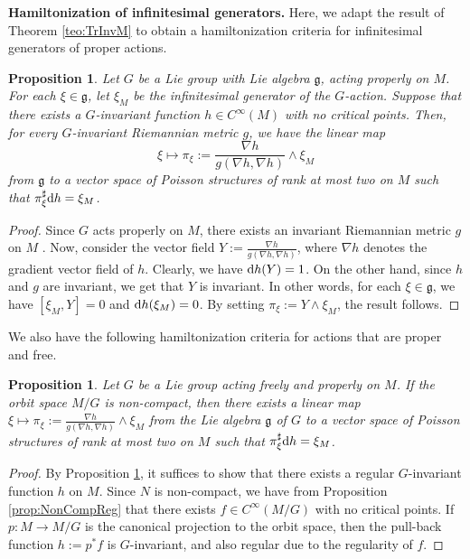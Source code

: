 \documentclass[10pt,a4paper]{amsart}
\newcommand{\dd}{{\rm d}}
\numberwithin{equation}{section}
\newtheorem{Proposition}[Theorem]{Proposition}
 { \theoremstyle{definition}
\newtheorem{Definition}[Theorem]{Definition}
\newtheorem{Note}[Theorem]{Note}
\newtheorem{Example}[Theorem]{Example}
\newtheorem{Remark}[Theorem]{Remark} }
\begin{document}
{\bf Hamiltonization of infinitesimal generators.} Here, we adapt the result of Theorem \ref{teo:TrInvM} to obtain a hamiltonization criteria for infinitesimal generators of proper actions.

\begin{Proposition}\label{prop:InfHam}
Let $G$ be a Lie group with Lie algebra $\mathfrak{g}$, acting properly on $M$. For each $\xi \in \mathfrak{g}$, let $\xi_{M}$ be the infinitesimal generator of the $G$-action.
Suppose that there exists a $G$-invariant function $h \in C^{\infty}(M)$ with no critical points.
Then, for every $G$-invariant Riemannian metric $g$, we have the linear map
 \begin{equation*}
 \xi \mapsto \pi_{\xi}:=\frac{\nabla h}{g(\nabla h,\nabla h)}\wedge\xi_{M}
 \end{equation*}
from $\mathfrak{g}$ to a vector space of Poisson structures of rank at most two on $M$ such that $\pi_{\xi}^{\sharp}\dd h = \xi_{M}$.
\end{Proposition}
\begin{proof}
Since $G$ acts properly on $M$, there exists an invariant Riemannian metric $g$ on $M$ \cite[Proposition 2.5.2]{Duistermaat-1999}. Now, consider the vector field $Y := \tfrac{\nabla h}{g(\nabla h,\nabla h)}$, where $\nabla h$ denotes the gradient vector field of $h$. Clearly, we have $\dd h(Y) = 1$. On the other hand, since $h$ and $g$ are invariant, we get that $Y$ is invariant. In other words, for each $\xi \in \mathfrak{g}$, we have $[\xi_{M},Y] = 0$ and $\dd h(\xi_{M}) = 0$. By setting $\pi_{\xi} := Y \wedge \xi_{M}$, the result follows.
\end{proof}

We also have the following hamiltonization criteria for actions that are proper and free.

\begin{Proposition}\label{prop:InfHam2}
Let $G$ be a Lie group acting freely and properly on $M$. If the orbit space $M/G$ is non-compact, then there exists a linear map $\xi \mapsto \pi_{\xi}:=\frac{\nabla h}{g(\nabla h,\nabla h)}\wedge\xi_{M}$ from the Lie algebra $\mathfrak{g}$ of $G$ to a vector space of Poisson structures of rank at most two on $M$ such that $\pi_{\xi}^{\sharp}\dd h = \xi_{M}$.
\end{Proposition}
\begin{proof}
By Proposition \ref{prop:InfHam}, it suffices to show that there exists a regular $G$-invariant function $h$ on $M$. Since $N$ is non-compact, we have from Proposition \ref{prop:NonCompReg} that there exists $f \in C^{\infty}(M/G)$ with no critical points. If $p\colon M\to M/G$ is the canonical projection to the orbit space, then the pull-back function $h:=p^{*}f$ is $G$-invariant, and also regular due to the regularity of $f$.
\end{proof}
\end{document}
